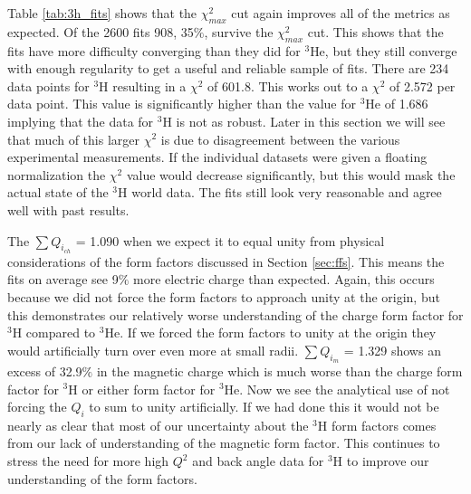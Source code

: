Table \ref{tab:3h_fits} shows that the $\chi^2_{max}$ cut again improves all of the metrics as expected. Of the 2600 fits 908, 35$\%$, survive the $\chi^2_{max}$ cut. This shows that the fits have more difficulty converging than they did for $^3$He, but they still converge with enough regularity to get a useful and reliable sample of fits. There are 234 data points for $^3$H resulting in a $\chi^2$ of 601.8. This works out to a $\chi^2$ of 2.572 per data point. This value is significantly higher than the value for $^3$He of 1.686 implying that the data for $^3$H is not as robust. Later in this section we will see that much of this larger $\chi^2$ is due to disagreement between the various experimental measurements. If the individual datasets were given a floating normalization the $\chi^2$ value would decrease significantly, but this would mask the actual state of the $^3$H world data. The fits still look very reasonable and agree well with past results.%

The $\sum Q_{i_{ch}}$ = 1.090 when we expect it to equal unity from physical considerations of the form factors discussed in Section \ref{sec:ffs}. This means the fits on average see 9$\%$ more electric charge than expected. Again, this occurs because we did not force the form factors to approach unity at the origin, but this demonstrates our relatively worse understanding of the charge form factor for $^3$H compared to $^3$He. If we forced the form factors to unity at the origin they would artificially turn over even more at small radii. $\sum Q_{i_{m}}$ = 1.329 shows an excess of 32.9$\%$ in the magnetic charge which is much worse than the charge form factor for $^3$H or either form factor for $^3$He. Now we see the analytical use of not forcing the $Q_i$ to sum to unity artificially. If we had done this it would not be nearly as clear that most of our uncertainty about the $^3$H form factors comes from our lack of understanding of the magnetic form factor. This continues to stress the need for more high $Q^2$ and back angle data for $^3$H to improve our understanding of the form factors.%

